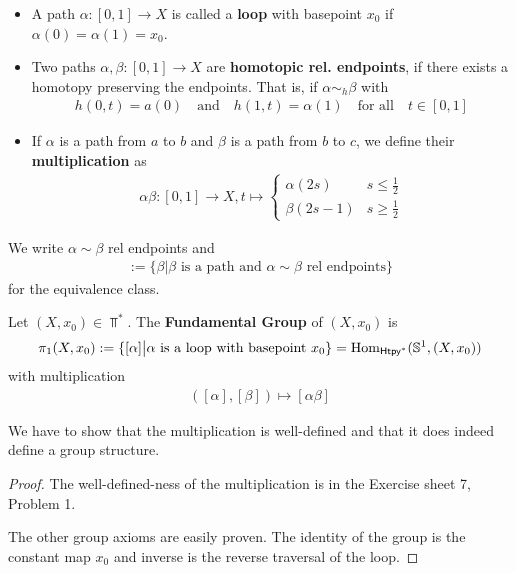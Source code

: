 \begin{dfn}[]
\begin{itemize}
  \item A path $\alpha: [0,1] \to  X$ is called a \textbf{loop} with basepoint $x_0$ if $\alpha(0) = \alpha(1) = x_0$.
  \item Two paths $\alpha,\beta: [0,1] \to  X$ are \textbf{homotopic rel. endpoints}, if there exists a homotopy preserving the endpoints. That is, if $\alpha\sim_h \beta$ with
    \begin{align*}
      h(0,t) = a(0) \quad \text{and} \quad h(1,t) = \alpha(1) \quad \text{for all} \quad t \in [0,1]
    \end{align*}
  \item If $\alpha$ is a path from $a$ to $b$ and $\beta$ is a path from $b$ to $c$, we define their \textbf{multiplication} as
    \begin{align*}
      \alpha \beta : [0,1] \to  X, t \mapsto  \left\{\begin{array}{ll}
          \alpha(2s) & s \leq \tfrac{1}{2}\\
          \beta(2s - 1) & s \geq \tfrac{1}{2}
      \end{array} \right.
    \end{align*}
\end{itemize} 
We write $\alpha \sim \beta$ rel endpoints and
\begin{align*}
  [\alpha] := \{\beta | \beta\text{ is a path and } \alpha \sim \beta \text{ rel endpoints}\}
\end{align*}
for the equivalence class.
\end{dfn}


\begin{dfn}[]
  Let $(X,x_0) \in \Top^{\ast}$.
  The \textbf{Fundamental Group} of $(X,x_0)$ is 
  \begin{align*}
    \pi_1(X,x_0) := \{[\alpha] \big\vert \alpha \text{ is a loop with basepoint $x_0$}\} = \operatorname{Hom}_{\text{\sffamily Htpy}^{\ast}}(\mathbb{S}^{1},(X,x_0))
  \end{align*}
  with multiplication
  \begin{align*}
    ([\alpha],[\beta]) \mapsto [\alpha \beta]
  \end{align*}
\end{dfn}
We have to show that the multiplication is well-defined and that it does indeed define a group structure.
\begin{proof}
  The well-defined-ness of the multiplication is in the Exercise sheet 7, Problem 1.

  The other group axioms are easily proven.
  The identity of the group is the constant map $x_0$ and inverse is the reverse traversal of the loop.
\end{proof}

